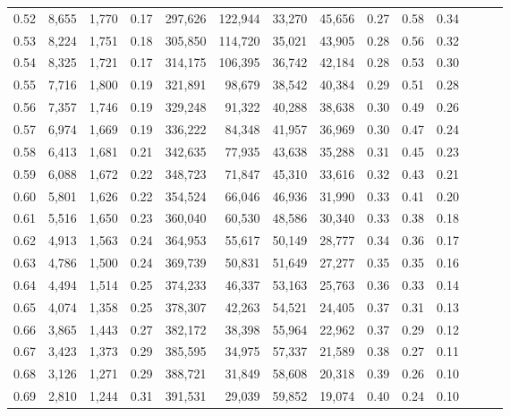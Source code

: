 \begin{tabular}{rrrrrrrrrrrrrr}
0.52 &   8,655 &  1,770 &  0.17 &  297,626 &  122,944 &  33,270 &  45,656 &  0.27 &  0.58 &      0.34 \\
0.53 &   8,224 &  1,751 &  0.18 &  305,850 &  114,720 &  35,021 &  43,905 &  0.28 &  0.56 &      0.32 \\
0.54 &   8,325 &  1,721 &  0.17 &  314,175 &  106,395 &  36,742 &  42,184 &  0.28 &  0.53 &      0.30 \\
0.55 &   7,716 &  1,800 &  0.19 &  321,891 &   98,679 &  38,542 &  40,384 &  0.29 &  0.51 &      0.28 \\
0.56 &   7,357 &  1,746 &  0.19 &  329,248 &   91,322 &  40,288 &  38,638 &  0.30 &  0.49 &      0.26 \\
0.57 &   6,974 &  1,669 &  0.19 &  336,222 &   84,348 &  41,957 &  36,969 &  0.30 &  0.47 &      0.24 \\
0.58 &   6,413 &  1,681 &  0.21 &  342,635 &   77,935 &  43,638 &  35,288 &  0.31 &  0.45 &      0.23 \\
0.59 &   6,088 &  1,672 &  0.22 &  348,723 &   71,847 &  45,310 &  33,616 &  0.32 &  0.43 &      0.21 \\
0.60 &   5,801 &  1,626 &  0.22 &  354,524 &   66,046 &  46,936 &  31,990 &  0.33 &  0.41 &      0.20 \\
0.61 &   5,516 &  1,650 &  0.23 &  360,040 &   60,530 &  48,586 &  30,340 &  0.33 &  0.38 &      0.18 \\
0.62 &   4,913 &  1,563 &  0.24 &  364,953 &   55,617 &  50,149 &  28,777 &  0.34 &  0.36 &      0.17 \\
0.63 &   4,786 &  1,500 &  0.24 &  369,739 &   50,831 &  51,649 &  27,277 &  0.35 &  0.35 &      0.16 \\
0.64 &   4,494 &  1,514 &  0.25 &  374,233 &   46,337 &  53,163 &  25,763 &  0.36 &  0.33 &      0.14 \\
0.65 &   4,074 &  1,358 &  0.25 &  378,307 &   42,263 &  54,521 &  24,405 &  0.37 &  0.31 &      0.13 \\
0.66 &   3,865 &  1,443 &  0.27 &  382,172 &   38,398 &  55,964 &  22,962 &  0.37 &  0.29 &      0.12 \\
0.67 &   3,423 &  1,373 &  0.29 &  385,595 &   34,975 &  57,337 &  21,589 &  0.38 &  0.27 &      0.11 \\
0.68 &   3,126 &  1,271 &  0.29 &  388,721 &   31,849 &  58,608 &  20,318 &  0.39 &  0.26 &      0.10 \\
0.69 &   2,810 &  1,244 &  0.31 &  391,531 &   29,039 &  59,852 &  19,074 &  0.40 &  0.24 &      0.10 \\

\end{tabular}
